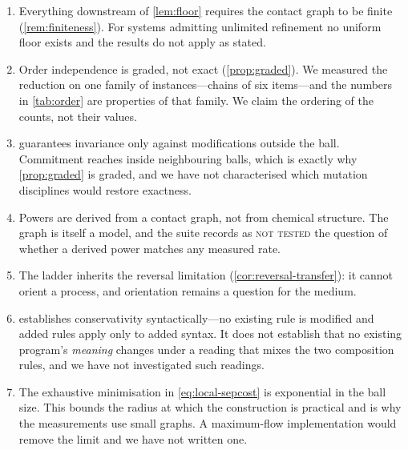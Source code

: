 \documentclass[11pt,twocolumn,a4paper]{article}
\theoremstyle{plain}
\theoremstyle{definition}
\theoremstyle{remark}
\begin{document}
\begin{enumerate}[leftmargin=2em,itemsep=0.4em]

\item Everything downstream of \cref{lem:floor} requires the contact graph to
be finite (\cref{rem:finiteness}). For systems admitting unlimited refinement
no uniform floor exists and the results do not apply as stated.

\item Order independence is graded, not exact (\cref{prop:graded}). We measured
the reduction on one family of instances---chains of six items---and the
numbers in \cref{tab:order} are properties of that family. We claim the
ordering of the counts, not their values.

\item {} guarantees invariance only against modifications
outside the ball. Commitment reaches inside neighbouring balls, which is
exactly why \cref{prop:graded} is graded, and we have not characterised which
mutation disciplines would restore exactness.

\item Powers are derived from a contact graph, not from chemical structure. The
graph is itself a model, and the suite records as \textsc{not tested} the
question of whether a derived power matches any measured rate.

\item The ladder inherits the reversal limitation
(\cref{cor:reversal-transfer}): it cannot orient a process, and orientation
remains a question for the medium.

\item {} establishes conservativity syntactically---no
existing rule is modified and added rules apply only to added syntax. It does
not establish that no existing program's \emph{meaning} changes under a reading
that mixes the two composition rules, and we have not investigated such
readings.

\item The exhaustive minimisation in \cref{eq:local-sepcost} is exponential in
the ball size. This bounds the radius at which the construction is practical
and is why the measurements use small graphs. A maximum-flow implementation
would remove the limit and we have not written one.

\end{enumerate}

\end{document}

